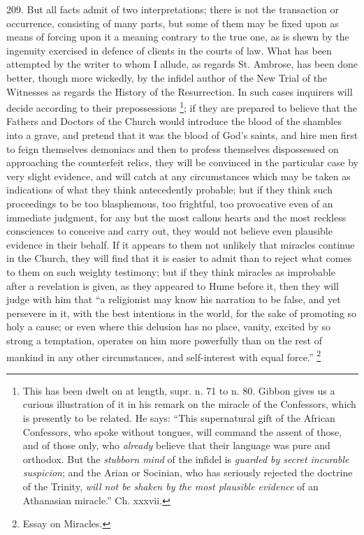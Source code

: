 209.
But all facts admit of two interpretations; there is not the
transaction or occurrence, consisting of many parts, but some of them
may be fixed upon as means of forcing upon it a meaning contrary to
the true one, as is shewn by the ingenuity exercised in defence of
clients in the courts of law. What has been attempted by the writer to
whom I allude, as regards St. Ambrose, has been done better, though
more wickedly, by the infidel author of the New Trial of the Witnesses
as regards the History of the Resurrection. In such cases inquirers
will decide according to their prepossessions \footnote{This has been dwelt on at length, supr. n. 71 to n. 80. Gibbon gives
us a curious illustration of it in his remark on the miracle of the
Confessors, which is presently to be related. He says: ``This
supernatural gift of the African Confessors, who spoke without
tongues, will command the assent of those, and of those only, who \emph{already}
believe that their language was pure and orthodox. But the \emph{stubborn
mind} of the infidel is \emph{guarded by secret incurable suspicion};
and the Arian or Socinian, who has seriously rejected the doctrine of
the Trinity, \emph{will not be shaken by the most plausible evidence}
of an Athanasian miracle.'' Ch. xxxvii.}; if they are prepared to believe that the Fathers and
Doctors of the Church would introduce the blood of the shambles into a
grave, and pretend that it was the blood of God's saints, and hire men
first to feign themselves demoniacs and then to profess themselves
dispossessed on approaching the counterfeit relics, they will be
convinced in the particular case by very slight evidence, and will
catch at any circumstances which may be taken as indications of what
they think antecedently probable; but if they think such proceedings
to be too blasphemous, too frightful, too provocative even of an
immediate judgment, for any but the most callous hearts and the most
reckless consciences to conceive and carry out, they would not believe
even plausible evidence in their behalf. If it appears to them not
unlikely that miracles continue in the Church, they will find that it
is easier to admit than to reject what comes to them on such weighty
testimony; but if they think miracles as improbable after a revelation
is given, as they appeared to Hume before it, then they will judge
with him that ``a religionist may know his narration to be false, and
yet persevere in it, with the best intentions in the world, for
the sake of promoting so holy a cause; or even where this delusion has
no place, vanity, excited by so strong a temptation, operates on him
more powerfully than on the rest of mankind in any other
circumstances, and self-interest with equal force.'' \footnote{Essay on Miracles.}

